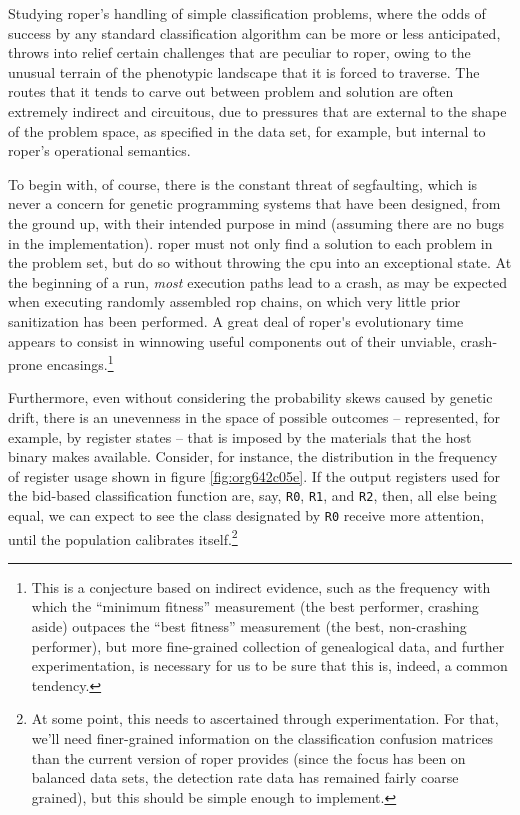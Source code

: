 \documentclass[12pt,glossary]{dalthesis}
\begin{document}
Studying \gls{roper}'s handling of simple classification problems, where the
odds of success by any standard classification algorithm can be more or less
anticipated, throws into relief certain challenges that are peculiar to \gls{roper},
owing to the unusual terrain of the phenotypic landscape that it is forced to
traverse. The routes that it tends to carve out between problem and solution
are often extremely indirect and circuitous, due to pressures that are external
to the shape of the problem space, as specified in the data set, for example, but
internal to \gls{roper}'s operational semantics.

To begin with, of course, there is the constant threat of segfaulting, which is
never a concern for genetic programming systems that have been designed, from the
ground up, with their intended purpose in mind (assuming there are no bugs in the
implementation). \Gls{roper} must not only find a solution to each problem in the
problem set, but do so without throwing the \gls{cpu} into an exceptional state. At
the beginning of a run, \emph{most} execution paths lead to a crash, as may be expected
when executing randomly assembled \gls{rop} chains, on which very little prior
sanitization has been performed. A great deal of \gls{roper's} evolutionary time
appears to consist in winnowing useful components out of their unviable, crash-prone
encasings.\footnote{This is a conjecture based on indirect evidence, such as the frequency with which
  the ``minimum fitness'' measurement (the best performer, crashing aside) outpaces
  the ``best fitness'' measurement (the best, non-crashing performer), but more
  fine-grained collection of genealogical data, and further experimentation, is
  necessary for us to be sure that this is, indeed, a common tendency.} 


Furthermore, even without considering the probability skews caused by genetic drift,
there is an unevenness in the space of possible outcomes -- represented, for example,
by register states -- that is imposed by the materials that the host binary makes
available. Consider, for instance, the distribution in the frequency of register
usage shown in figure \ref{fig:org642c05e}. If the output registers
used for the bid-based classification function are, say, \texttt{R0}, \texttt{R1}, and \texttt{R2}, then,
all else being equal, we can expect to see the class designated by \texttt{R0} receive 
more attention, until the population calibrates itself.\footnote{At some point, this needs to ascertained through experimentation. For that, we'll
  need finer-grained information on the classification confusion matrices than the
  current version of \gls{roper} provides (since the focus has been on balanced data
  sets, the detection rate data has remained fairly coarse grained), but this should
  be simple enough to implement.}
\end{document}
